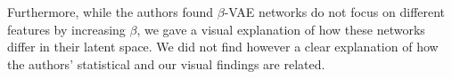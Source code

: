 Furthermore, while the authors found $\beta$-VAE networks do not focus on different features by increasing $\beta$, we gave a visual explanation of how these networks differ in their latent space. We did not find however a clear explanation of how the authors' statistical and our visual findings are related.


